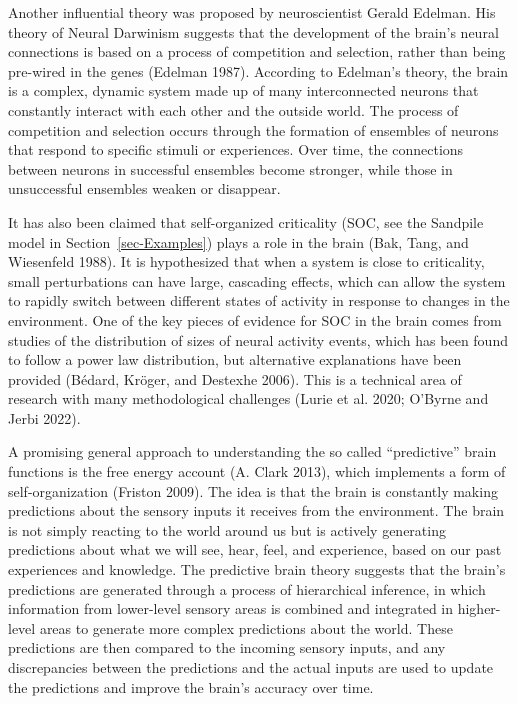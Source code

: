 \documentclass[
  a4paper,
  DIV=11,
  numbers=noendperiod]{scrreprt}
\begin{document}
Another influential theory was proposed by neuroscientist Gerald
Edelman. His theory of Neural Darwinism suggests that the development of
the brain's neural connections is based on a process of competition and
selection, rather than being pre-wired in the genes (Edelman 1987).
According to Edelman's theory, the brain is a complex, dynamic system
made up of many interconnected neurons that constantly interact with
each other and the outside world. The process of competition and
selection occurs through the formation of ensembles of neurons that
respond to specific stimuli or experiences. Over time, the connections
between neurons in successful ensembles become stronger, while those in
unsuccessful ensembles weaken or disappear.

It has also been claimed that self-organized criticality (SOC, see the
Sandpile model in Section~\ref{sec-Examples}) plays a role in the brain
(Bak, Tang, and Wiesenfeld 1988). It is hypothesized that when a system
is close to criticality, small perturbations can have large, cascading
effects, which can allow the system to rapidly switch between different
states of activity in response to changes in the environment. One of the
key pieces of evidence for SOC in the brain comes from studies of the
distribution of sizes of neural activity events, which has been found to
follow a power law distribution, but alternative explanations have been
provided (Bédard, Kröger, and Destexhe 2006). This is a technical area
of research with many methodological challenges (Lurie et al. 2020;
O'Byrne and Jerbi 2022).

A promising general approach to understanding the so called
``predictive'' brain functions is the free energy account (A. Clark
2013), which implements a form of self-organization (Friston 2009). The
idea is that the brain is constantly making predictions about the
sensory inputs it receives from the environment. The brain is not simply
reacting to the world around us but is actively generating predictions
about what we will see, hear, feel, and experience, based on our past
experiences and knowledge. The predictive brain theory suggests that the
brain's predictions are generated through a process of hierarchical
inference, in which information from lower-level sensory areas is
combined and integrated in higher-level areas to generate more complex
predictions about the world. These predictions are then compared to the
incoming sensory inputs, and any discrepancies between the predictions
and the actual inputs are used to update the predictions and improve the
brain's accuracy over time.
\end{document}
